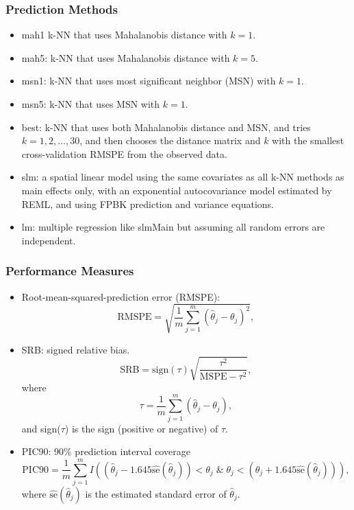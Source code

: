 \documentclass[mathserif,compress]{beamer}\usepackage{graphicx, color}
\begin{document}
\begin{frame}[fragile]
\frametitle{Prediction Methods}

\footnotesize
\begin{itemize}
\item mah1 k-NN that uses Mahalanobis distance with $k=1$.
\item mah5: k-NN that uses Mahalanobis distance with $k=5$.
\item msn1: k-NN that uses most significant neighbor (MSN) with $k=1$.
\item msn5: k-NN that uses MSN with $k=1$.
\item best: k-NN that uses both Mahalanobis distance and MSN, and tries $k=1, 2, \ldots, 30$, and then chooses the distance matrix and $k$ with the smallest cross-validation RMSPE from the observed data.
\item slm: a spatial linear model using the same covariates as all k-NN methods as main effects only, with an exponential autocovariance model estimated by REML, and using FPBK prediction and variance equations.
\item lm: multiple regression like slmMain but assuming all random errors are independent.
\end{itemize}

\end{frame}

\begin{frame}[fragile]
\frametitle{Performance Measures}
\tiny
\begin{itemize}
	\item 
	Root-mean-squared-prediction error (RMSPE): 
	\[
		\textrm{RMSPE}=\sqrt{\frac{1}{m}\sum_{j=1}^m(\hat{\theta}_j-\theta_j)^2},
	\]

	\item
		SRB: signed relative bias.
	\[
		\textrm{SRB}=\textrm{sign}(\tau)\sqrt{\frac{\tau^2}{\textrm{MSPE}-\tau^2}},
	\]
	where
	\[
		\tau=\frac{1}{m}\sum_{j=1}^m(\hat{\theta}_j-\theta_j),
	\]
	and sign($\tau$) is the sign (positive or negative) of $\tau$.
	\item
	PIC90: 90\% prediction interval coverage
	\[
		\textrm{PIC90}=\frac{1}{m}\sum_{j=1}^mI\left(\left(\hat{\theta}_j-1.645\hat{\textrm{se}}(\hat{\theta}_j)\right) < \theta_j \; \& \;  \theta_j < \left(\hat{\theta}_j+1.645\hat{\textrm{se}}(\hat{\theta}_j)\right) \right),
	\]
where 
$\hat{\textrm{se}}(\hat{\theta}_j)$ is the estimated standard error of  $\hat{\theta}_j$. 
\end{itemize}

\end{frame}
\end{document}
